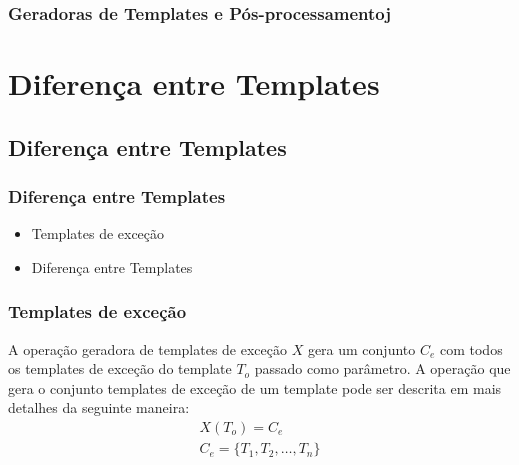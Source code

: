 \documentclass[aspectratio=43,hyperref={pdfpagelabels=false}]{beamer}
\begin{document}
 \begin{frame}
    \frametitle{Geradoras de Templates e Pós-processamentoj}
    \vspace{-0.8cm}
\begin{table}[h!]
\centering
\caption{Pós-processamento necessário por templates}
    \vspace{-0.8cm}
\label{tab:posProcessamento}
\end{table}
\end{frame} 


 \section{Diferença entre Templates}
 \subsection*{Diferença entre Templates}
 \begin{frame}
     \frametitle{Diferença entre Templates}
     \begin{itemize}
           \item Templates de exceção
           \item Diferença entre Templates
     \end{itemize}
 \end{frame}

 \begin{frame}
     \frametitle{Templates de exceção}

      A operação geradora de templates de exceção $X$ gera um conjunto $C_e$ com todos os templates de exceção do template $T_o$ passado como parâmetro. A operação que gera o conjunto templates de exceção de um template pode ser descrita em mais detalhes da seguinte maneira:
      \begin{equation}
      \begin{split}
      X(T_o)= C_e \\
      C_e = \{T_1,T_2,\dots, T_n\}\\
      \end{split}
      \end{equation}     
 \end{frame}
\end{document}
